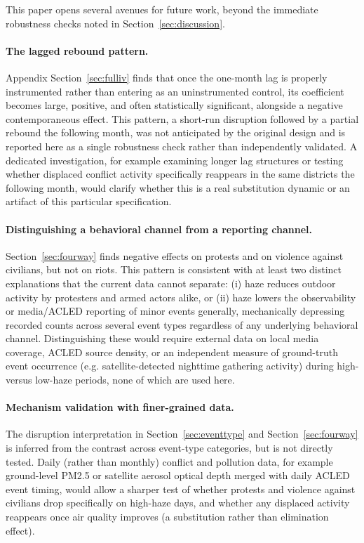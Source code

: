 \documentclass[12pt]{article}
\begin{document}
This paper opens several avenues for future work, beyond the immediate robustness checks noted in Section~\ref{sec:discussion}.

\paragraph{The lagged rebound pattern.} Appendix Section~\ref{sec:fulliv} finds that once the one-month lag is properly instrumented rather than entering as an uninstrumented control, its coefficient becomes large, positive, and often statistically significant, alongside a negative contemporaneous effect. This pattern, a short-run disruption followed by a partial rebound the following month, was not anticipated by the original design and is reported here as a single robustness check rather than independently validated. A dedicated investigation, for example examining longer lag structures or testing whether displaced conflict activity specifically reappears in the same districts the following month, would clarify whether this is a real substitution dynamic or an artifact of this particular specification.

\paragraph{Distinguishing a behavioral channel from a reporting channel.} Section~\ref{sec:fourway} finds negative effects on protests and on violence against civilians, but not on riots. This pattern is consistent with at least two distinct explanations that the current data cannot separate: (i) haze reduces outdoor activity by protesters and armed actors alike, or (ii) haze lowers the observability or media/ACLED reporting of minor events generally, mechanically depressing recorded counts across several event types regardless of any underlying behavioral channel. Distinguishing these would require external data on local media coverage, ACLED source density, or an independent measure of ground-truth event occurrence (e.g. satellite-detected nighttime gathering activity) during high- versus low-haze periods, none of which are used here.

\paragraph{Mechanism validation with finer-grained data.} The disruption interpretation in Section~\ref{sec:eventtype} and Section~\ref{sec:fourway} is inferred from the contrast across event-type categories, but is not directly tested. Daily (rather than monthly) conflict and pollution data, for example ground-level PM2.5 or satellite aerosol optical depth merged with daily ACLED event timing, would allow a sharper test of whether protests and violence against civilians drop specifically on high-haze days, and whether any displaced activity reappears once air quality improves (a substitution rather than elimination effect).
\end{document}
